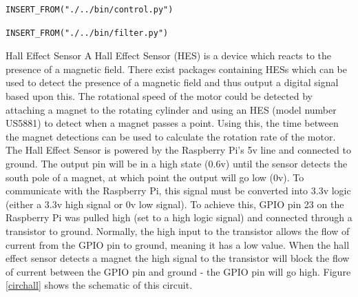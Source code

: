 \documentclass[twoside,a4]{report}
\def\br{\newline \newline \noindent}
\begin{document}
\begin{Verbatim}[frame=single]
INSERT_FROM("./../bin/control.py")
\end{Verbatim}
\begin{Verbatim}[frame=single]
INSERT_FROM("./../bin/filter.py")
\end{Verbatim}
\large Hall Effect Sensor \normalsize \br
A Hall Effect Sensor (HES) is a device which reacts to the presence of a magnetic field. There exist packages containing HESs which can be used to detect the presence of a magnetic field and thus output a digital signal based upon this. The rotational speed of the motor could be detected by attaching a magnet to the rotating cylinder and using an HES (model number US5881) to detect when a magnet passes a point. Using this, the time between the magnet detections can be used to calculate the rotation rate of the motor. \br
The Hall Effect Sensor is powered by the Raspberry Pi's 5v line and connected to ground. The output pin will be in a high state (0.6v) until the sensor detects the south pole of a magnet, at which point the output will go low (0v). To communicate with the Raspberry Pi, this signal must be converted into 3.3v logic (either a 3.3v high signal or 0v low signal). To achieve this, GPIO pin 23 on the Raspberry Pi was pulled high (set to a high logic signal) and connected through a transistor to ground. Normally, the high input to the transistor allows the flow of current from the GPIO pin to ground, meaning it has a low value. When the hall effect sensor detects a magnet the high signal to the transistor will block the flow of current between the GPIO pin and ground - the GPIO pin will go high. Figure \ref{circhall} shows the schematic of this circuit. \newline
\end{document}
